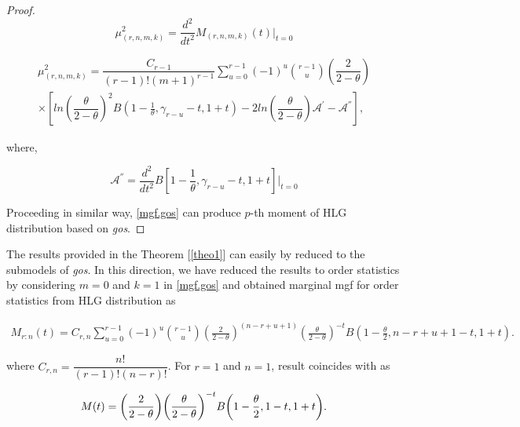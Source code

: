 \documentclass[11pt,a4paper]{article}
\numberwithin{equation}{section}
\begin{document}
\begin{proof}
		\begin{equation}

			\mu_{(r,n,m,k)}^{2}=\frac{d^{2}}{dt^{2}}M_{(r,n,m,k)}(t)\Bigg|_{t=0}\nonumber

		\end{equation}

		\begin{eqnarray}\label{moment2.gos}

			\mu_{(r,n,m,k)}^{2}=\dfrac{C_{r-1}}{(r-1)!(m+1)^{r-1}}\sum_{u=0}^{r-1}(-1)^{u}\binom{r-1}{u}\left(\dfrac{2}{2-\theta}\right)\nonumber\\

			\times\left[ln\left(\dfrac{\theta}{2-\theta}\right)^{2}B\left(1-\frac{1}{\theta},\gamma_{r-u}-t,1+t\right)-2ln\left(\dfrac{\theta}{2-\theta}\right)\mathcal{A}^{'}-\mathcal{A}^{''}\right],

		\end{eqnarray}

		where, 

		\begin{equation}

			\mathcal{A}^{''}={\frac{d^{2}}{dt^{2}}}B\left[1-\frac{1}{\theta},\gamma_{r-u}-t,1+t\right]\Bigg|_{t=0}\nonumber

		\end{equation}

		Proceeding in similar way, \eqref{mgf.gos} can produce $p$-th moment of HLG distribution based on \textit{gos}. 

		\end{proof}

\noindent The results provided in the Theorem [\ref{theo1}] can easily by reduced to the submodels of \textit{gos}. In this direction, we have reduced the results to order statistics by considering $m=0$ and $k=1$ in \eqref{mgf.gos} and obtained marginal mgf for order statistics from HLG distribution as

	\begin{eqnarray}

	M_{r:n}(t)=C_{r,n}\sum_{u=0}^{r-1}(-1)^{u}\binom{r-1}{u}{\left(\frac{2}{2-\theta}\right)}^{(n-r+u+1)}{\left(\frac{\theta}{2-\theta}\right)}^{-t} B{\left(1-\frac{\theta}{2},n-r+u+1-t,1+t\right)}.\nonumber

\end{eqnarray}

where $C_{r,n}=\dfrac{n!}{(r-1)!(n-r)!}$. For $r=1$ and $n=1$, result coincides with \cite{liu2020recurrence} as

 			\begin{equation}

			M(t)={\left(\frac{2}{2-\theta}\right)}{\left(\frac{\theta}{2-\theta}\right)}^{-t}B{\left(1-\frac{\theta}{2},1-t,1+t\right)}.\nonumber\\

		\end{equation}
\end{document}
